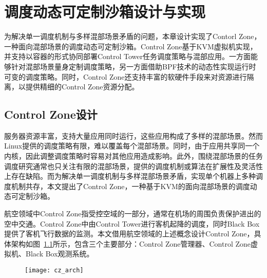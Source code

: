 \chapter{调度动态可定制沙箱设计与实现}\label{chap:control_zone}

为解决单一调度机制与多样混部场景矛盾的问题，本章设计实现了Contorl Zone，一种面向混部场景的调度动态可定制沙箱。Control Zone基于KVM虚拟机实现，并支持以容器的形式协同部署Control Tower任务调度策略与混部应用。一方面能够针对混部场景量身定制调度策略，另一方面借助BPF技术的动态性实现运行时可变的调度策略。同时，Control Zone还支持丰富的软硬件手段来对资源进行隔离，以提供精细的Control Zone资源分配。

\section{Control Zone设计}



服务器资源丰富，支持大量应用同时运行，这些应用构成了多样的混部场景。然而Linux提供的调度策略有限，难以覆盖每个混部场景。同时，由于应用共享同一个内核，因此调整调度策略时容易对其他应用造成影响。此外，围绕混部场景的任务调度研究通常也只关注有限的混部场景，提供的调度机制或算法在扩展性及灵活性上存在缺陷。而为解决单一调度机制与多样混部场景矛盾，实现单个机器上多种调度机制共存，本文提出了Control Zone，一种基于KVM的面向混部场景的调度动态可定制沙箱。

航空领域中Control Zone指受控空域的一部分，通常在机场的周围负责保护进出的空中交通。Control Zone中由Control Tower进行客机起降的调度，同时Black Box提供了客机飞行数据的监测。本文借用航空领域的上述概念设计Control Zone，具体架构如图~\ref{fig:cz_arch}所示，包含三个主要部分：Control Zone管理器、Control Zone虚拟机、Black Box观测系统。

\begin{figure}[!htbp]
    \centering
    \texttt{[image: cz\_arch]}
    \label{fig:cz_arch}
\end{figure}

